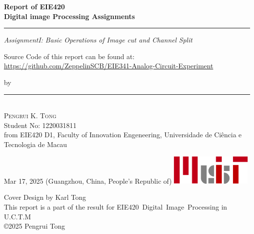 \begin{titlepage}
    \ActivateWarningFilters[latex]

    \parbox{1\textwidth}{ %
		{\Huge\bfseries Report of EIE420 \\[0.15\baselineskip] 
            Digital image Processing Assignments}\\[0.15\baselineskip] %
		\rule{1\textwidth}{1pt} %
        {\Large\textit{AssignmentI: Basic Operations of Image cut and Channel Split}}
        \newline
    }
    \parbox{1\textwidth}{
        \vspace{1\baselineskip}
        \large
        Source Code of this report can be found at:\newline
        \url{https://github.com/ZeppelinSCB/EIE341-Analog-Circuit-Experiment}
        \newline
    }
    \vspace{100pt} %
    \parbox{1\textwidth}{
        {\large by}\\[1.5\baselineskip]
        {\rule[1pt]{200pt}{1pt}} \\[1.25pt]
        {\huge\textsc{Pengrui K. Tong}
            }\\
        {\large{Student No: 1220031811}} \\
        \large from EIE420 D1, \newline
        Faculty of Innovation Engeneering, \newline
        Universidade de Ciência e Tecnologia de Macau
    }
		

    \vspace*{\fill}
		Mar 17, 2025 \newline 
        (Guangzhou, China, People's Republic of)
        \vspace{0.7\baselineskip}\newline
        \includegraphics[width = 40mm]{../Header/MUIT_origin.png}\par
        {\small Cover Design by Karl Tong}\\[0.25pt]
        {\small This report is a part of the result for}
        {\small EIE420~Digital~Image~Processing in U.C.T.M}\\[0.25pt]
        {\small \copyright 2025 Pengrui Tong}
\end{titlepage}